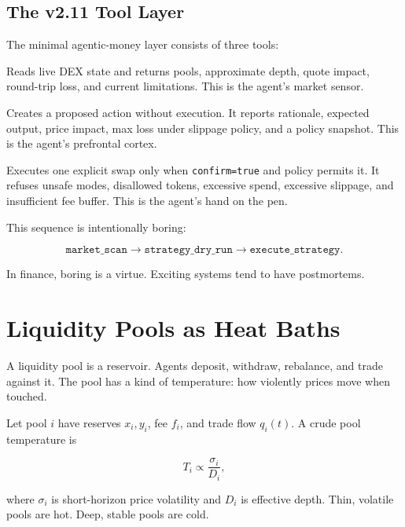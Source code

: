 \documentclass[11pt,a4paper]{article}
\begin{document}
\subsection{The v2.11 Tool Layer}

The minimal agentic-money layer consists of three tools:

\begin{codexbox}
Reads live DEX state and returns pools, approximate depth, quote impact, round-trip loss, and current limitations. This is the agent's market sensor.
\end{codexbox}

\begin{codexbox}
Creates a proposed action without execution. It reports rationale, expected output, price impact, max loss under slippage policy, and a policy snapshot. This is the agent's prefrontal cortex.
\end{codexbox}

\begin{codexbox}
Executes one explicit swap only when \texttt{confirm=true} and policy permits it. It refuses unsafe modes, disallowed tokens, excessive spend, excessive slippage, and insufficient fee buffer. This is the agent's hand on the pen.
\end{codexbox}

This sequence is intentionally boring:

\[
\texttt{market\_scan} \rightarrow \texttt{strategy\_dry\_run} \rightarrow \texttt{execute\_strategy}.
\]

In finance, boring is a virtue. Exciting systems tend to have postmortems.

\section{Liquidity Pools as Heat Baths}

A liquidity pool is a reservoir. Agents deposit, withdraw, rebalance, and trade against it. The pool has a kind of temperature: how violently prices move when touched.

Let pool \(i\) have reserves \(x_i, y_i\), fee \(f_i\), and trade flow \(q_i(t)\). A crude pool temperature is

\[
T_i \propto \frac{\sigma_i}{D_i},
\]

where \(\sigma_i\) is short-horizon price volatility and \(D_i\) is effective depth. Thin, volatile pools are hot. Deep, stable pools are cold.
\end{document}
